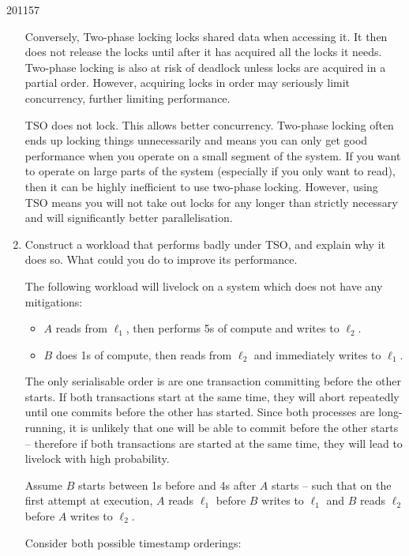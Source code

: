 \documentclass[10pt,\jkfside,a4paper]{article}
\begin{document}
\begin{examquestion}{2011}{5}{7}
\begin{enumerate}[label=(\alph*)]
Conversely, Two-phase locking locks shared data when accessing it. It then
does not release the locks until after it has acquired all the locks it
needs. Two-phase locking is also at risk of deadlock unless locks are
acquired in a partial order. However, acquiring locks in order may
seriously limit concurrency, further limiting performance.

TSO does not lock. This allows better concurrency. Two-phase locking often
ends up locking things unnecessarily and means you can only get good
performance when you operate on a small segment of the system. If you want
to operate on large parts of the system (especially if you only want to
read), then it can be highly inefficient to use two-phase locking. However,
using TSO means you will not take out locks for any longer than strictly
necessary and will significantly better parallelisation.

\fi

\item Construct a workload that performs badly under TSO, and explain why it
does so. What could you do to improve its performance.

The following workload will livelock on a system which does not have any
mitigations:

\begin{itemize}

\item $A$ reads from $\ell_1$, then performs 5s of compute and writes to
$\ell_2$.

\item $B$ does 1s of compute, then reads from $\ell_2$ and immediately
writes to $\ell_1$.

\end{itemize}

The only serialisable order is are one transaction committing before the
other starts. If both transactions start at the same time, they will abort
repeatedly until one commits before the other has started. Since both
processes are long-running, it is unlikely that one will be able to commit
before the other starts -- therefore if both transactions are started at
the same time, they will lead to livelock with high probability.

Assume $B$ starts between 1s before and 4s after $A$ starts -- such that on
the first attempt at execution, $A$ reads $\ell_1$ before $B$ writes to
$\ell_1$ and $B$ reads $\ell_2$ before $A$ writes to $\ell_2$.

Consider both possible timestamp orderings:


\end{enumerate}
\end{examquestion}
\end{document}
